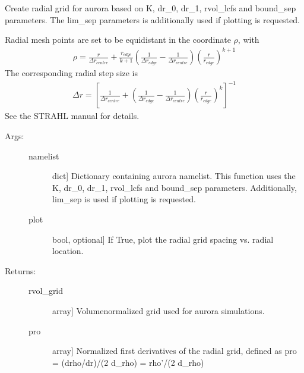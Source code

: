 \documentclass[letterpaper,10pt,english]{sphinxmanual}
\begin{document}
\begin{fulllineitems}
\label{\detokenize{aurora:aurora.grids_utils.create_radial_grid}}
Create radial grid for aurora based on K, dr\_0, dr\_1, rvol\_lcfs and bound\_sep parameters. 
The lim\_sep parameters is additionally used if plotting is requested.

Radial mesh points are set to be equidistant in the coordinate \(\rho\), with
\begin{equation*}
\begin{split}\rho = \frac{r}{\Delta r_{centre}} + \frac{r_{edge}}{k+1} \left(\frac{1}{\Delta r_{edge}}- \frac{1}{\Delta r_{centre}} \right) \left(\frac{r}{r_{edge}} \right)^{k+1}\end{split}
\end{equation*}
The corresponding radial step size is
\begin{equation*}
\begin{split}\Delta r = \left[\frac{1}{\Delta r_{centre}} + \left(\frac{1}{\Delta r_{edge}} - \frac{1}{\Delta r_{centre}} \right) \left(\frac{r}{r_{edge}}\right)^k \right]^{-1}\end{split}
\end{equation*}
See the STRAHL manual for details.
\begin{description}
\item[{Args:}] \leavevmode\begin{description}
\item[{namelist}] \leavevmode{[}dict{]}
Dictionary containing aurora namelist. This function uses the K, dr\_0, dr\_1, rvol\_lcfs 
and bound\_sep parameters. Additionally, lim\_sep is used if plotting is requested.

\item[{plot}] \leavevmode{[}bool, optional{]}
If True, plot the radial grid spacing vs. radial location.

\end{description}

\item[{Returns:}] \leavevmode\begin{description}
\item[{rvol\_grid}] \leavevmode{[}array{]}
Volume\sphinxhyphen{}normalized grid used for aurora simulations.

\item[{pro}] \leavevmode{[}array{]}
Normalized first derivatives of the radial grid, defined as 
pro = (drho/dr)/(2 d\_rho) = rho’/(2 d\_rho)


\end{description}
\end{description}
\end{fulllineitems}
\end{document}
